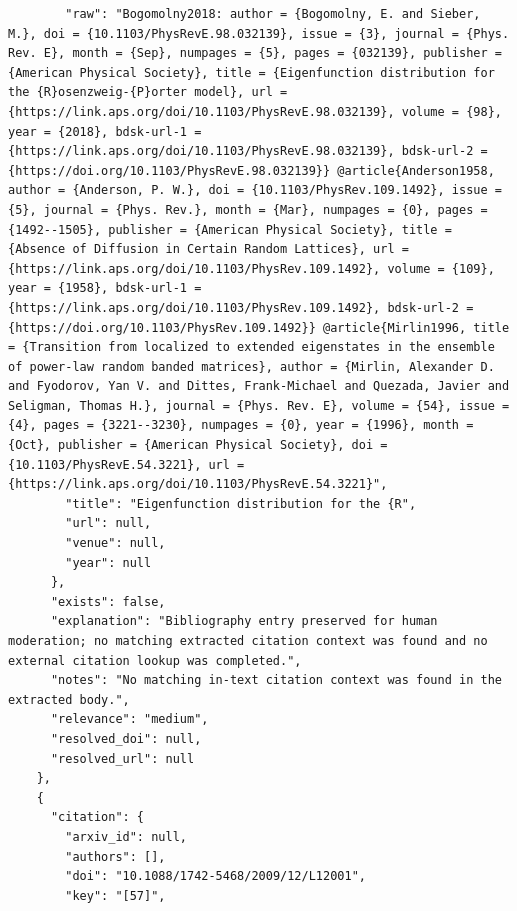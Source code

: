 \documentclass[11pt]{article}
\begin{document}
\begin{verbatim}
        "raw": "Bogomolny2018: author = {Bogomolny, E. and Sieber, M.}, doi = {10.1103/PhysRevE.98.032139}, issue = {3}, journal = {Phys. Rev. E}, month = {Sep}, numpages = {5}, pages = {032139}, publisher = {American Physical Society}, title = {Eigenfunction distribution for the {R}osenzweig-{P}orter model}, url = {https://link.aps.org/doi/10.1103/PhysRevE.98.032139}, volume = {98}, year = {2018}, bdsk-url-1 = {https://link.aps.org/doi/10.1103/PhysRevE.98.032139}, bdsk-url-2 = {https://doi.org/10.1103/PhysRevE.98.032139}} @article{Anderson1958, author = {Anderson, P. W.}, doi = {10.1103/PhysRev.109.1492}, issue = {5}, journal = {Phys. Rev.}, month = {Mar}, numpages = {0}, pages = {1492--1505}, publisher = {American Physical Society}, title = {Absence of Diffusion in Certain Random Lattices}, url = {https://link.aps.org/doi/10.1103/PhysRev.109.1492}, volume = {109}, year = {1958}, bdsk-url-1 = {https://link.aps.org/doi/10.1103/PhysRev.109.1492}, bdsk-url-2 = {https://doi.org/10.1103/PhysRev.109.1492}} @article{Mirlin1996, title = {Transition from localized to extended eigenstates in the ensemble of power-law random banded matrices}, author = {Mirlin, Alexander D. and Fyodorov, Yan V. and Dittes, Frank-Michael and Quezada, Javier and Seligman, Thomas H.}, journal = {Phys. Rev. E}, volume = {54}, issue = {4}, pages = {3221--3230}, numpages = {0}, year = {1996}, month = {Oct}, publisher = {American Physical Society}, doi = {10.1103/PhysRevE.54.3221}, url = {https://link.aps.org/doi/10.1103/PhysRevE.54.3221}",
        "title": "Eigenfunction distribution for the {R",
        "url": null,
        "venue": null,
        "year": null
      },
      "exists": false,
      "explanation": "Bibliography entry preserved for human moderation; no matching extracted citation context was found and no external citation lookup was completed.",
      "notes": "No matching in-text citation context was found in the extracted body.",
      "relevance": "medium",
      "resolved_doi": null,
      "resolved_url": null
    },
    {
      "citation": {
        "arxiv_id": null,
        "authors": [],
        "doi": "10.1088/1742-5468/2009/12/L12001",
        "key": "[57]",

\end{verbatim}
\end{document}
